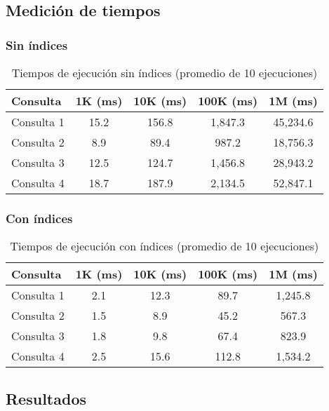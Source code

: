 \documentclass[12pt,a4paper]{article}
\begin{document}
\subsection{Medición de tiempos}

\subsubsection{Sin índices}

\begin{table}[h!]
\centering
\begin{tabular}{|l|c|c|c|c|}
\hline
\textbf{Consulta} & \textbf{1K (ms)} & \textbf{10K (ms)} & \textbf{100K (ms)} & \textbf{1M (ms)} \\
\hline
Consulta 1 & 15.2 & 156.8 & 1,847.3 & 45,234.6 \\
Consulta 2 & 8.9 & 89.4 & 987.2 & 18,756.3 \\
Consulta 3 & 12.5 & 124.7 & 1,456.8 & 28,943.2 \\
Consulta 4 & 18.7 & 187.9 & 2,134.5 & 52,847.1 \\
\hline
\end{tabular}
\caption{Tiempos de ejecución sin índices (promedio de 10 ejecuciones)}
\label{table:sin_indices}
\end{table}

\subsubsection{Con índices}

\begin{table}[h!]
\centering
\begin{tabular}{|l|c|c|c|c|}
\hline
\textbf{Consulta} & \textbf{1K (ms)} & \textbf{10K (ms)} & \textbf{100K (ms)} & \textbf{1M (ms)} \\
\hline
Consulta 1 & 2.1 & 12.3 & 89.7 & 1,245.8 \\
Consulta 2 & 1.5 & 8.9 & 45.2 & 567.3 \\
Consulta 3 & 1.8 & 9.8 & 67.4 & 823.9 \\
Consulta 4 & 2.5 & 15.6 & 112.8 & 1,534.2 \\
\hline
\end{tabular}
\caption{Tiempos de ejecución con índices (promedio de 10 ejecuciones)}
\label{table:con_indices}
\end{table}

\subsection{Resultados}
\end{document}

